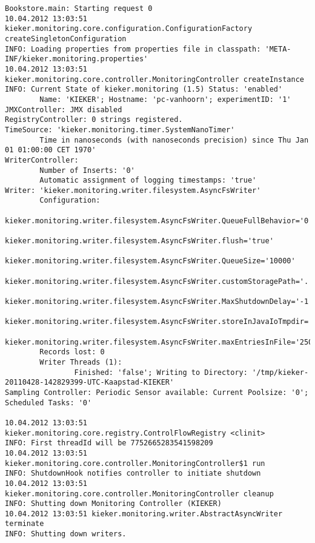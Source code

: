 \setTextListing
\begin{lstlisting}[caption=Execution of the Bookstore with AspectJ trace instrumentation (Section~\ref{sec:traceAnalysis:instr:AspectJ})]
Bookstore.main: Starting request 0
10.04.2012 13:03:51 kieker.monitoring.core.configuration.ConfigurationFactory createSingletonConfiguration
INFO: Loading properties from properties file in classpath: 'META-INF/kieker.monitoring.properties'
10.04.2012 13:03:51 kieker.monitoring.core.controller.MonitoringController createInstance
INFO: Current State of kieker.monitoring (1.5) Status: 'enabled'
        Name: 'KIEKER'; Hostname: 'pc-vanhoorn'; experimentID: '1'
JMXController: JMX disabled
RegistryController: 0 strings registered.
TimeSource: 'kieker.monitoring.timer.SystemNanoTimer'
        Time in nanoseconds (with nanoseconds precision) since Thu Jan 01 01:00:00 CET 1970'
WriterController:
        Number of Inserts: '0'
        Automatic assignment of logging timestamps: 'true'
Writer: 'kieker.monitoring.writer.filesystem.AsyncFsWriter'
        Configuration:
                kieker.monitoring.writer.filesystem.AsyncFsWriter.QueueFullBehavior='0'
                kieker.monitoring.writer.filesystem.AsyncFsWriter.flush='true'
                kieker.monitoring.writer.filesystem.AsyncFsWriter.QueueSize='10000'
                kieker.monitoring.writer.filesystem.AsyncFsWriter.customStoragePath='.'
                kieker.monitoring.writer.filesystem.AsyncFsWriter.MaxShutdownDelay='-1'
                kieker.monitoring.writer.filesystem.AsyncFsWriter.storeInJavaIoTmpdir='true'
                kieker.monitoring.writer.filesystem.AsyncFsWriter.maxEntriesInFile='25000'
        Records lost: 0
        Writer Threads (1): 
                Finished: 'false'; Writing to Directory: '/tmp/kieker-20110428-142829399-UTC-Kaapstad-KIEKER'
Sampling Controller: Periodic Sensor available: Current Poolsize: '0'; Scheduled Tasks: '0'

10.04.2012 13:03:51 kieker.monitoring.core.registry.ControlFlowRegistry <clinit>
INFO: First threadId will be 7752665283541598209
10.04.2012 13:03:51 kieker.monitoring.core.controller.MonitoringController$1 run
INFO: ShutdownHook notifies controller to initiate shutdown
10.04.2012 13:03:51 kieker.monitoring.core.controller.MonitoringController cleanup
INFO: Shutting down Monitoring Controller (KIEKER)
10.04.2012 13:03:51 kieker.monitoring.writer.AbstractAsyncWriter terminate
INFO: Shutting down writers.
\end{lstlisting}


